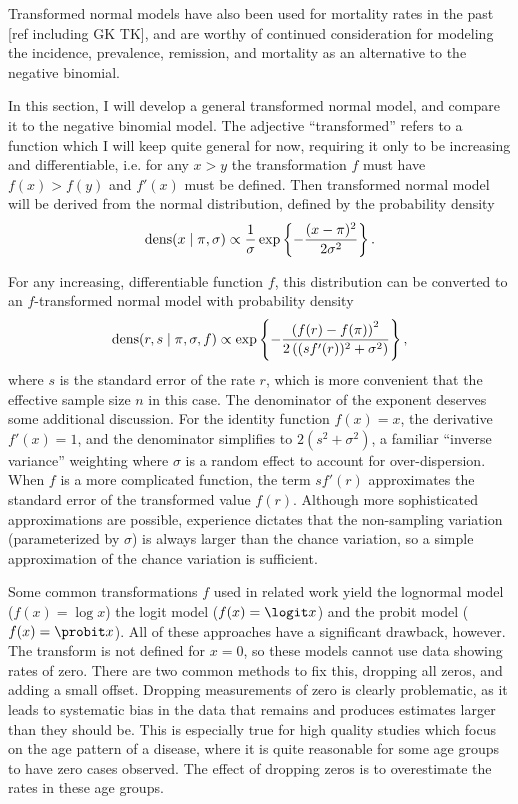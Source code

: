 Transformed normal models have also been used for mortality rates in
the past [ref including GK TK], and are worthy of continued consideration for
modeling the incidence, prevalence, remission, and mortality as an
alternative to the negative binomial.

In this section, I will develop a general transformed normal model,
and compare it to the negative binomial model.  The adjective
``transformed'' refers to a function which I will keep quite general
for now, requiring it only to be increasing and differentiable,
i.e. for any $x > y$ the transformation $f$ must have $f(x) > f(y)$
and $f'(x)$ must be defined.  Then transformed normal model will be
derived from the normal distribution, defined by the probability
density
\[
\operatorname{dens}(x\;|\; \pi, \sigma) \propto \frac{1}{\sigma} \exp\left\{ -\frac{(x-\pi)^2}{2\sigma^2} \right\}.
\]

For any increasing, differentiable function $f$, this distribution can be converted to
an $f$-transformed normal model with probability density
\[
\operatorname{dens}(r,s\;|\; \pi, \sigma, f) \propto \exp\left\{-\frac{\left(f(r)-f(\pi)\right)^2}{2\left((sf'(r))^2+\sigma^2\right)}\right\},
\]
where $s$ is the standard error of the rate $r$, which is more
convenient that the effective sample size $n$ in this case. The
denominator of the exponent deserves some additional discussion.  For
the identity function $f(x) = x$, the derivative $f'(x) = 1$, and the
denominator simplifies to $2(s^2 + \sigma^2)$, a familiar ``inverse
variance'' weighting where $\sigma$ is a random effect to account for
over-dispersion.  When $f$ is a more complicated function, the term
$sf'(r)$ approximates the standard error of the transformed value
$f(r)$.  Although more sophisticated approximations are possible,
experience dictates that the non-sampling variation (parameterized by
$\sigma$) is always larger than the chance variation, so a simple
approximation of the chance variation is sufficient.

Some common transformations $f$ used in related work yield the
lognormal model ($f(x) = \log x$) the logit model ($f(x) = \logit x$)
and the probit model ($f(x) = \probit x$).  All of these approaches
have a significant drawback, however.  The transform is not defined
for $x=0$, so these models cannot use data showing rates of zero.
There are two common methods to fix this, dropping all zeros, and
adding a small offset.  Dropping measurements of zero is clearly
problematic, as it leads to systematic bias in the data that remains
and produces estimates larger than they should be.  This is especially
true for high quality studies which focus on the age pattern of a
disease, where it is quite reasonable for some age groups to have zero
cases observed.  The effect of dropping zeros is to overestimate the
rates in these age groups.

